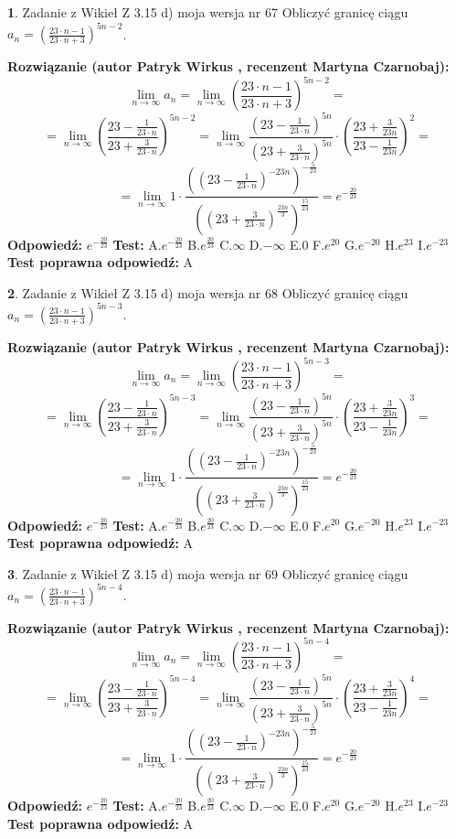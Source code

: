 \documentclass[12pt, a4paper]{article}
\theoremstyle{definition} %
\newtheorem{zad}{}
\newcommand{\zadStart}[1]{\begin{zad}#1\newline}
\newcommand{\zadStop}{\end{zad}}
\newcommand{\rozwStart}[2]{\noindent \textbf{Rozwiązanie (autor #1 , recenzent #2): }\newline}
\newcommand{\rozwStop}{\newline}
\newcommand{\odpStart}{\noindent \textbf{Odpowiedź:}\newline}
\newcommand{\odpStop}{\newline}
\newcommand{\testStart}{\noindent \textbf{Test:}\newline}
\newcommand{\testStop}{\newline}
\newcommand{\kluczStart}{\noindent \textbf{Test poprawna odpowiedź:}\newline}
\newcommand{\kluczStop}{\newline}
\begin{document}
\zadStart{Zadanie z Wikieł Z 3.15 d) moja wersja nr 67}
Obliczyć granicę ciągu $a_{n}=(\frac{23\cdot n - 1}{23 \cdot n + 3})^{5n-2}$.
\zadStop
\rozwStart{Patryk Wirkus}{Martyna Czarnobaj}
$$\lim\limits_{n\to\infty} a_{n} = \lim\limits_{n\to\infty}(\frac{23\cdot n - 1}{23 \cdot n + 3})^{5n-2}=$$
$$=\lim\limits_{n\to\infty}(\frac{23 - \frac{1}{23\cdot n}}{23 + \frac{3}{23 \cdot n}})^{5n-2}=\lim\limits_{n\to\infty}\frac{(23 - \frac{1}{23\cdot n})^{5n}}{(23 + \frac{3}{23\cdot n})^{5n}} \cdot (\frac{23+\frac{3}{23n}}{23-\frac{1}{23n}})^{2}=$$
$$=\lim\limits_{n\to\infty} 1 \cdot \frac{((23-\frac{1}{23 \cdot n})^{-23n})^{-\frac{5}{23}}}{((23+\frac{3}{23 \cdot n})^{\frac{23n}{3}})^{\frac{15}{23}}} =e^{-\frac{20}{23}}$$
\rozwStop
\odpStart
$e^{-\frac{20}{23}}$
\odpStop
\testStart
A.$ e^{-\frac{20}{23}}$
B.$ e^{\frac{20}{23}}$
C.$\infty$
D.$-\infty$
E.$0$
F.$e^{20}$
G.$e^{-20}$
H.$e^{23}$
I.$e^{-23}$
\testStop
\kluczStart
A
\kluczStop



\zadStart{Zadanie z Wikieł Z 3.15 d) moja wersja nr 68}
Obliczyć granicę ciągu $a_{n}=(\frac{23\cdot n - 1}{23 \cdot n + 3})^{5n-3}$.
\zadStop
\rozwStart{Patryk Wirkus}{Martyna Czarnobaj}
$$\lim\limits_{n\to\infty} a_{n} = \lim\limits_{n\to\infty}(\frac{23\cdot n - 1}{23 \cdot n + 3})^{5n-3}=$$
$$=\lim\limits_{n\to\infty}(\frac{23 - \frac{1}{23\cdot n}}{23 + \frac{3}{23 \cdot n}})^{5n-3}=\lim\limits_{n\to\infty}\frac{(23 - \frac{1}{23\cdot n})^{5n}}{(23 + \frac{3}{23\cdot n})^{5n}} \cdot (\frac{23+\frac{3}{23n}}{23-\frac{1}{23n}})^{3}=$$
$$=\lim\limits_{n\to\infty} 1 \cdot \frac{((23-\frac{1}{23 \cdot n})^{-23n})^{-\frac{5}{23}}}{((23+\frac{3}{23 \cdot n})^{\frac{23n}{3}})^{\frac{15}{23}}} =e^{-\frac{20}{23}}$$
\rozwStop
\odpStart
$e^{-\frac{20}{23}}$
\odpStop
\testStart
A.$ e^{-\frac{20}{23}}$
B.$ e^{\frac{20}{23}}$
C.$\infty$
D.$-\infty$
E.$0$
F.$e^{20}$
G.$e^{-20}$
H.$e^{23}$
I.$e^{-23}$
\testStop
\kluczStart
A
\kluczStop



\zadStart{Zadanie z Wikieł Z 3.15 d) moja wersja nr 69}
Obliczyć granicę ciągu $a_{n}=(\frac{23\cdot n - 1}{23 \cdot n + 3})^{5n-4}$.
\zadStop
\rozwStart{Patryk Wirkus}{Martyna Czarnobaj}
$$\lim\limits_{n\to\infty} a_{n} = \lim\limits_{n\to\infty}(\frac{23\cdot n - 1}{23 \cdot n + 3})^{5n-4}=$$
$$=\lim\limits_{n\to\infty}(\frac{23 - \frac{1}{23\cdot n}}{23 + \frac{3}{23 \cdot n}})^{5n-4}=\lim\limits_{n\to\infty}\frac{(23 - \frac{1}{23\cdot n})^{5n}}{(23 + \frac{3}{23\cdot n})^{5n}} \cdot (\frac{23+\frac{3}{23n}}{23-\frac{1}{23n}})^{4}=$$
$$=\lim\limits_{n\to\infty} 1 \cdot \frac{((23-\frac{1}{23 \cdot n})^{-23n})^{-\frac{5}{23}}}{((23+\frac{3}{23 \cdot n})^{\frac{23n}{3}})^{\frac{15}{23}}} =e^{-\frac{20}{23}}$$
\rozwStop
\odpStart
$e^{-\frac{20}{23}}$
\odpStop
\testStart
A.$ e^{-\frac{20}{23}}$
B.$ e^{\frac{20}{23}}$
C.$\infty$
D.$-\infty$
E.$0$
F.$e^{20}$
G.$e^{-20}$
H.$e^{23}$
I.$e^{-23}$
\testStop
\kluczStart
A
\kluczStop
\end{document}
